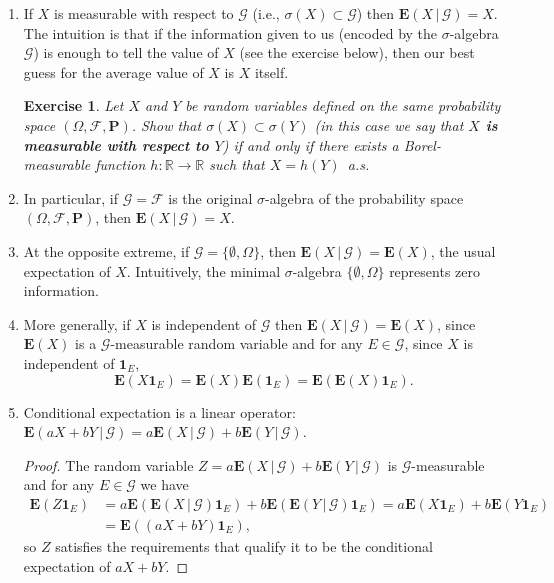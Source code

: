 \documentclass[12pt]{article}
\newtheorem{exercise}[thm]{Exercise}
\newcommand{\R}{\mathbb{R}}
\newcommand{\prob}{\mathbf{P}}
\newcommand{\expec}{\mathbf{E}}
\newcommand{\condexp}[2]{\expec\left(#1\,|\,#2\right)}
\newcommand{\ind}{\textbf{1}}
\theoremstyle{example}
\begin{document}
\begin{enumerate}
\item If $X$ is measurable with respect to $\mathcal{G}$ (i.e., $\sigma(X) \subset \mathcal{G}$) then
$\condexp{X}{\mathcal{G}} = X$. The intuition is that if the information given to us (encoded by the $\sigma$-algebra $\mathcal{G}$) is enough to tell the value of $X$ (see the exercise below), then our best guess for the average value of $X$ is $X$ itself.

\begin{exercise}
Let $X$ and $Y$ be random variables defined on the same probability space $(\Omega, \mathcal{F}, \prob)$. Show that $\sigma(X) \subset \sigma(Y)$ (in this case we say that \textbf{$X$ is measurable with respect to $Y$}) if and only if there exists a Borel-measurable function $h:\R\to\R$ such that $X=h(Y)$~a.s.
\end{exercise}


\item In particular, if $\mathcal{G}=\mathcal{F}$ is the original $\sigma$-algebra of the probability space $(\Omega, \mathcal{F}, \prob)$, then $\condexp{X}{\mathcal{G}} = X$.
\item At the opposite extreme, if $\mathcal{G}= \{ \emptyset, \Omega \}$, then $\condexp{X}{\mathcal{G}} = \expec(X)$, the usual expectation of $X$. Intuitively, the minimal $\sigma$-algebra $\{\emptyset, \Omega\}$ represents zero information.

\item More generally, if $X$ is independent of $\mathcal{G}$ then $\condexp{X}{\mathcal{G}}=\expec(X)$, since $\expec(X)$ is a $\mathcal{G}$-measurable random variable and for any $E\in\mathcal{G}$, since $X$ is independent of $\ind_E$,
$$\expec(X\ind_E) = \expec(X)\expec(\ind_E) = \expec(\expec(X)\ind_E). $$

\item Conditional expectation is a linear operator: $\condexp{aX+bY}{\mathcal{G}} = a \condexp{X}{\mathcal{G}} + b \condexp{Y}{\mathcal{G}}.$

\begin{proof}
The random variable $Z=a \condexp{X}{\mathcal{G}} + b \condexp{Y}{\mathcal{G}}$ is $\mathcal{G}$-measurable and for any $E\in\mathcal{G}$ we have
\begin{align*} \expec(Z\ind_E) &= a\expec(\condexp{X}{\mathcal{G}}\ind_E)+b\expec(\condexp{Y}{\mathcal{G}}\ind_E) = 
a \expec(X\ind_E)+b\expec(Y\ind_E) \\&=\expec((aX+bY)\ind_E),
\end{align*}
so $Z$ satisfies the requirements that qualify it to be the conditional expectation of $aX+bY$.
\end{proof}



\end{enumerate}
\end{document}
